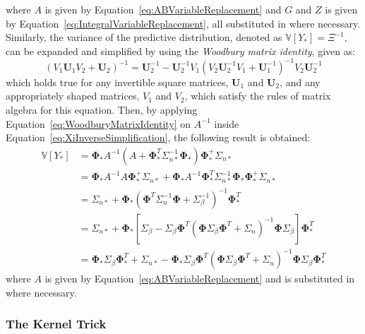 \documentclass{article}
\begin{document}
where $A$ is given by Equation~\eqref{eq:ABVariableReplacement} and $G$ and $Z$ is given by Equation~\eqref{eq:IntegralVariableReplacement}, all substituted in where necessary. Similarly, the variance of the predictive distribution, denoted as $\mathbb{V}\!\left[Y_*\right] = \Xi^{-1}$, can be expanded and simplified by using the \emph{Woodbury matrix identity}, given as:
\begin{equation}
\label{eq:WoodburyMatrixIdentity}
	\left(V_1 \mathbf{U}_1 V_2 + \mathbf{U}_2\right)^{-1} = \mathbf{U}_2^{-1} - \mathbf{U}_2^{-1} V_1 \left(V_2 \mathbf{U}_2^{-1} V_1 + \mathbf{U}_1^{-1}\right)^{-1} V_2 \mathbf{U}_2^{-1}
\end{equation}
which holds true for any invertible square matrices, $\mathbf{U}_1$ and $\mathbf{U}_2$, and any appropriately shaped matrices, $V_1$ and $V_2$, which satisfy the rules of matrix algebra for this equation. Then, by applying Equation~\eqref{eq:WoodburyMatrixIdentity} on $A^{-1}$ inside Equation~\eqref{eq:XiInverseSimplification}, the following result is obtained:
\begin{equation}
\label{eq:GPRPredictiveVariance}
	\begin{aligned}
	\mathbb{V}\!\left[Y_*\right] &= \mathbf{\Phi}_* A^{-1} \left(A + \mathbf{\Phi}_*^T \Sigma_{n*}^{-1} \mathbf{\Phi}_*\right) \mathbf{\Phi}_*^+ \Sigma_{n*} \\
	&= \mathbf{\Phi}_* A^{-1} A \mathbf{\Phi}_*^+ \Sigma_{n*} + \mathbf{\Phi}_* A^{-1} \mathbf{\Phi}_*^T \Sigma_{n*}^{-1} \mathbf{\Phi}_* \mathbf{\Phi}_*^+ \Sigma_{n*} \\
	&= \Sigma_{n*} + \mathbf{\Phi}_* \left(\mathbf{\Phi}^T \Sigma_n^{-1} \mathbf{\Phi} + \Sigma_\beta^{-1}\right)^{-1} \mathbf{\Phi}_*^T \\
	&= \Sigma_{n*} + \mathbf{\Phi}_* \left[\Sigma_\beta - \Sigma_\beta \mathbf{\Phi}^T \! \left(\mathbf{\Phi} \Sigma_\beta \mathbf{\Phi}^T + \Sigma_n\right)^{-1} \mathbf{\Phi} \Sigma_\beta\right] \mathbf{\Phi}_*^T \\
	&= \mathbf{\Phi}_* \Sigma_\beta \mathbf{\Phi}_*^T + \Sigma_{n*} - \mathbf{\Phi}_* \Sigma_\beta \mathbf{\Phi}^T \! \left(\mathbf{\Phi} \Sigma_\beta \mathbf{\Phi}^T + \Sigma_n\right)^{-1} \mathbf{\Phi} \Sigma_\beta \mathbf{\Phi}_*^T
	\end{aligned}
\end{equation}
where $A$ is given by Equation~\eqref{eq:ABVariableReplacement} and is substituted in where necessary.

\subsubsection{The Kernel Trick}
\label{subsubsec:GPRKernelDerivation}
\end{document}
